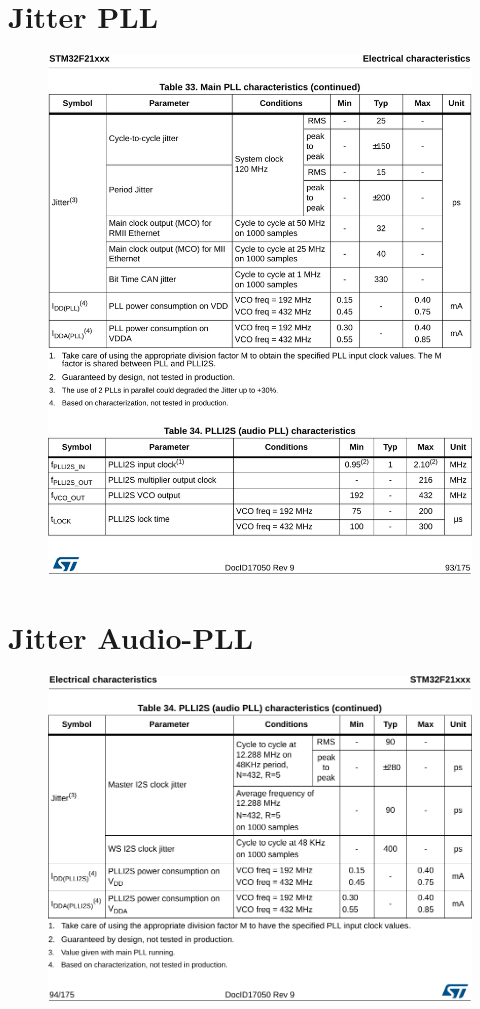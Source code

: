\begin{appendices}
	\section{Jitter PLL}
	\begin{figure}[h!]
		\centering
		\includegraphics[width=1\textwidth]{stm32f21xx-jitter-pll.pdf}
	\end{figure}
	
	\newpage
	\section{Jitter Audio-PLL}
	\begin{figure}[h!]
		\centering
		\includegraphics[width=1\textwidth]{stm32f21xx-jitter-audio-pll.pdf}
	\end{figure}
\end{appendices}

